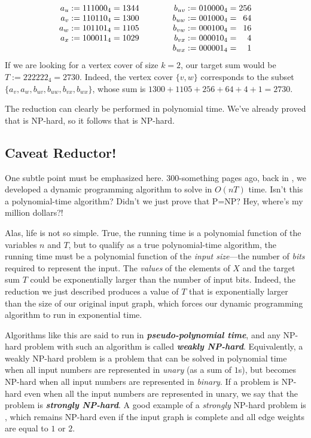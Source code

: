 \[
\begin{array}{r@{{}:={}}l@{{}={}}r@{\qquad\qquad}r@{{}:={}}l@{{}={}}r}
a_u & 111000_4 & 1344 & b_{uv} & 010000_4 & 256\\
a_v & 110110_4 & 1300 & b_{uw} & 001000_4 & 64\\
a_w & 101101_4 & 1105 & b_{vw} & 000100_4 & 16\\
a_x & 100011_4 & 1029 & b_{vx} & 000010_4 & 4\\
\multicolumn{3}{l@{\qquad\qquad}}{} & b_{wx} & 000001_4 & 1
\end{array}
\]
If we are looking for a vertex cover of size $k = 2$, our target sum would be $T := 222222_4 = 2730$.
Indeed, the vertex cover $\{v, w\}$ corresponds to the subset $\{a_v, a_w, b_{uv}, b_{uw}, b_{vx}, b_{wx}\}$, whose sum is $1300+1105+256+64+4+1 = 2730$.

The reduction can clearly be performed in polynomial time.
We’ve already proved that  is NP-hard, so it follows that  is NP-hard.

\subsection{Caveat Reductor!}

One subtle point must be emphasized here.
$3$00-something pages ago, back in , we developed a dynamic programming algorithm to solve  in $O(nT)$ time.
Isn’t this a polynomial-time algorithm?
Didn’t we just prove that P=NP?
Hey, where’s my million dollars?!

Alas, life is not so simple.
True, the running time is a polynomial function of the variables $n$ and $T$, but to qualify as a true polynomial-time algorithm, the running time must be a polynomial function of the \textit{input size}---the number of \textit{bits} required to represent the input.
The \textit{values} of the elements of $X$ and the target sum $T$ could be exponentially larger than the number of input bits.
Indeed, the reduction we just described produces a value of $T$ that is exponentially larger than the size of our original input graph, which forces our dynamic programming algorithm to run in exponential time.

Algorithms like this are said to run in \textbf{\textit{pseudo-polynomial time}}, and any NP-hard problem with such an algorithm is called \textbf{\textit{weakly NP-hard}}.
Equivalently, a weakly NP-hard problem is a problem that can be solved in polynomial time when all input numbers are represented in \textit{unary} (as a sum of $1$s), but becomes NP-hard when all input numbers are represented in \textit{binary}.
If a problem is NP-hard even when all the input numbers are represented in unary, we say that the problem is \textbf{\textit{strongly NP-hard}}.
A good example of a \textit{strongly} NP-hard problem is , which remains NP-hard even if the input graph is complete and all edge weights are equal to $1$ or $2$.

